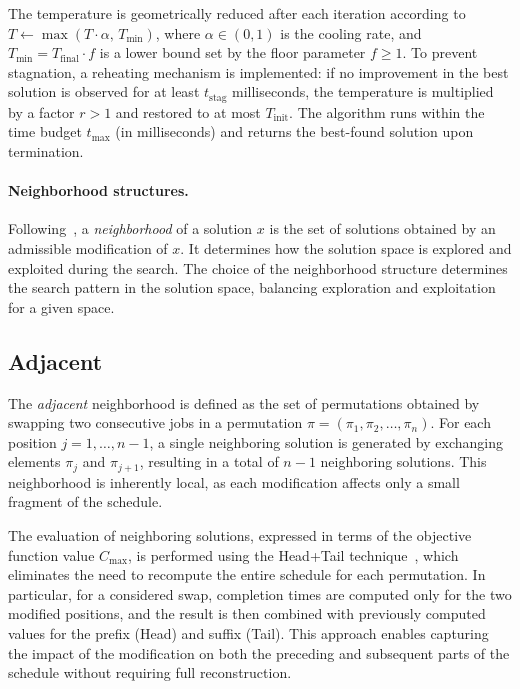 \documentclass[10pt,twoside,twocolumn,a4paper]{article}
\begin{document}
The temperature is geometrically reduced after each iteration according to $T \leftarrow \max(T \cdot \alpha,\, T_{\min})$, where $\alpha \in (0,1)$ is the cooling rate, and $T_{\min} = T_{\text{final}} \cdot f$ is a lower bound set by the floor parameter $f \ge 1$. To prevent stagnation, a reheating mechanism is implemented: if no improvement in the best solution is observed for at least $t_{\text{stag}}$ milliseconds, the temperature is multiplied by a factor $r > 1$ and restored to at most $T_{\text{init}}$. The algorithm runs within the time budget $t_{\max}$ (in milliseconds) and returns the best-found solution upon termination.



\paragraph{Neighborhood structures.}
Following~\cite{vanlaarhoven1992}, a \emph{neighborhood} of a solution $x$ is the set of solutions obtained by an admissible modification of $x$. It determines how the solution space is explored and exploited during the search. The choice of the neighborhood structure determines the search pattern in the solution space, balancing exploration and exploitation for a given space.

\subsection{Adjacent}
The \emph{adjacent} neighborhood is defined as the set of permutations obtained by swapping two consecutive jobs in a permutation $\pi = (\pi_1, \pi_2, \dots, \pi_n)$. For each position $j = 1, \dots, n-1$, a single neighboring solution is generated by exchanging elements $\pi_j$ and $\pi_{j+1}$, resulting in a total of $n-1$ neighboring solutions. This neighborhood is inherently local, as each modification affects only a small fragment of the schedule.

The evaluation of neighboring solutions, expressed in terms of the objective function value $C_{\max}$, is performed using the Head+Tail technique~\cite{taillard1990some}, which eliminates the need to recompute the entire schedule for each permutation. In particular, for a considered swap, completion times are computed only for the two modified positions, and the result is then combined with previously computed values for the prefix (Head) and suffix (Tail). This approach enables capturing the impact of the modification on both the preceding and subsequent parts of the schedule without requiring full reconstruction.
\end{document}
